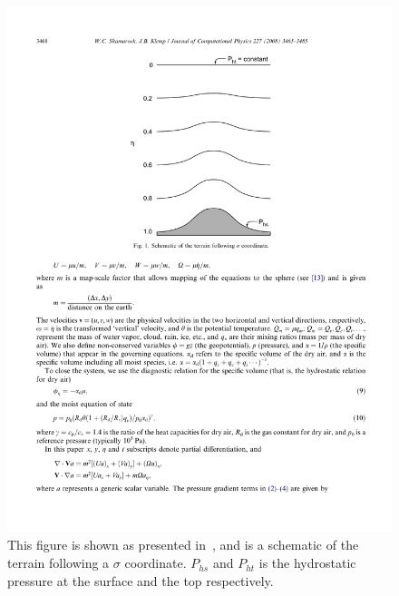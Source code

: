 \begin{figure}
\centering
\includegraphics[scale=1]{sigma.pdf}
\caption{This figure is shown as presented in~\cite{Skamarock2008}, and is a schematic of the terrain following a $\sigma$ coordinate. $P_{hs}$ and $P_{ht}$ is the hydrostatic pressure at the surface and the top respectively.}
\label{fig:sigma}
\end{figure}

